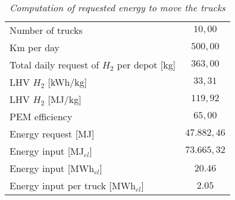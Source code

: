 \begin{table}[ht]
\centering
\begin{tabular}{|lc|}
\hline
\rowcolor{bluepoli!40}\multicolumn{2}{|c|}{\textbf{Energy Requirements}} \\ \hline
\multicolumn{1}{|l|}{Number of trucks}                                & $10,00$      \\ \hline
\multicolumn{1}{|l|}{Km per day}                                      & $500,00$     \\ \hline
\multicolumn{1}{|l|}{Total daily request of $H_2$ per depot {[}kg{]}} & $363,00$     \\ \hline
\multicolumn{1}{|l|}{LHV $H_2$ {[}kWh/kg{]}}                          & $33,31$      \\ \hline
\multicolumn{1}{|l|}{LHV $H_2$ {[}MJ/kg{]}}                           & $119,92$     \\ \hline
\multicolumn{1}{|l|}{PEM efficiency}                                  & $65,00$      \\ \hline
\multicolumn{1}{|l|}{Energy request {[}MJ{]}}                       & $47.882,46$  \\ \hline
\multicolumn{1}{|l|}{Energy input {[}MJ$_{el}${]}}                    & $73.665,32$  \\ \hline
\multicolumn{1}{|l|}{Energy input {[}MWh$_{el}${]}}                   & $20.46$      \\ \hline
\multicolumn{1}{|l|}{Energy input per truck {[}MWh$_{el}${]}}         & $2.05$       \\ \hline
\end{tabular}
\caption{\textit{Computation of requested energy to move the trucks}}
\label{tab:requested}
\end{table}